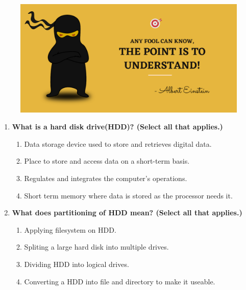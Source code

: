 \setlength{\columnsep}{3pt}
\begin{flushleft}
	
	\paragraph{}
	\bigskip
	
	\begin{figure}[h!]
		\centering
		\includegraphics[scale=.2]{content/practise.jpg}
	\end{figure}	
	\begin{enumerate}
		
		\item \textbf{What is a hard disk drive(HDD)? (Select all that applies.)}
		\begin{enumerate}[label=(\alph*)]
			\item Data storage device used to store and retrieves digital data. %
			\item Place to store and access data on a short-term basis. 
			\item Regulates and integrates the computer's operations.
			\item Short term memory where data is stored as the processor needs it.
		\end{enumerate}
		\bigskip
		\bigskip
		
		\item \textbf{What does partitioning of HDD mean? (Select all that applies.)}
		\begin{enumerate}[label=(\alph*)]
			\item Applying filesystem on HDD.
			\item Spliting a large hard disk into multiple drives. %
			\item Dividing HDD into logical drives.  %
			\item Converting a HDD into file and directory to make it useable. 
		\end{enumerate}
		\bigskip
		\bigskip	
		

\end{enumerate}
\end{flushleft}
